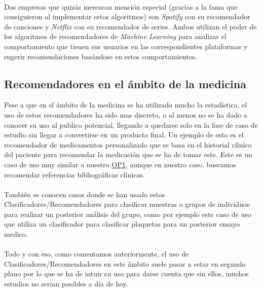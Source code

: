 \paragraph{}
Dos empresas que quizás merezcan mención especial (gracias a la fama que consiguieron al implementar estos algoritmos) son \textit{Spotify}\cite{ref:music_recommender} con su recomendador de canciones y \textit{Netflix}\cite{ref:netflix} con su recomendador de series. Ambos utilizan el poder de los algoritmos de recomendadores de \textit{Machine Learning} para analizar el comportamiento que tienen sus usuarios en las correspondientes plataformas y sugerir recomendaciones basándose en estos comportamientos.


\subsection{Recomendadores en el ámbito de la medicina}
Pese a que en el ámbito de la medicina se ha utilizado mucho la estadística, el uso de estos recomendadores ha sido mas discreto, o al menos no se ha dado a conocer su uso al publico potencial, llegando a quedarse solo en la fase de caso de estudio sin llegar a convertirse en un producto final. Un ejemplo de esto es el recomendador de medicamentos personalizado\cite{ref:refer_medical_prescriptions} que se basa en el historial clínico del paciente para recomendar la medicación que se ha de tomar este. Este es un caso de uso muy similar a nuestro \hyperref[op:OP1]{OP1}, aunque en nuestro caso, buscamos recomendar referencias bibliográficas clínicas.

\paragraph{}
También se conocen casos donde se han usado estos Clasificadores/Recomendadores para clasificar muestras o grupos de individuos para realizar un posterior análisis del grupo, como por ejemplo este caso de uso\cite{ref:refer_classify_plaquetas} que utiliza un clasificador para clasificar plaquetas para un posterior ensayo medico.

\paragraph{}
Todo y con eso, como comentamos anteriormente, el uso de Clasificadores/Recomendadores en este ámbito suele pasar a estar en segundo plano por lo que se ha de intuir su uso para darse cuenta que sin ellos, muchos estudios no serian posibles a día de hoy.

